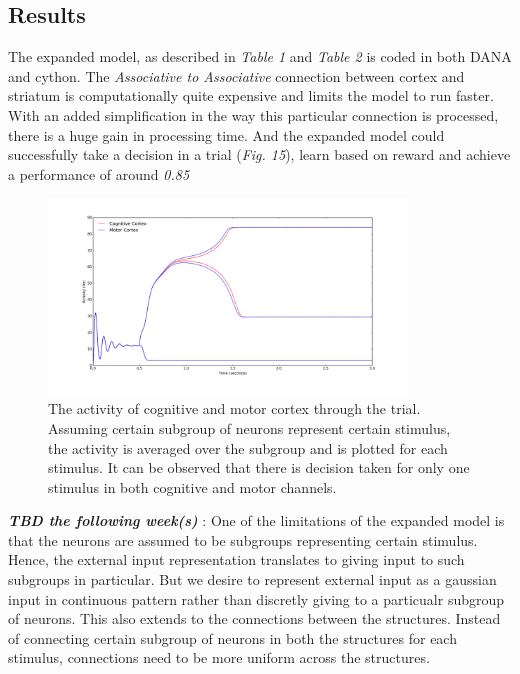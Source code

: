 \documentclass[11pt]{article}
\begin{document}
\subsection{Results}
The expanded model, as described in \emph{Table 1} and \emph{Table 2} is coded in both DANA and cython. The \emph{Associative to Associative} connection between cortex and striatum is computationally quite expensive and limits the model to run faster. With an added simplification in the way this particular connection is processed, there is a huge gain in processing time. And the expanded model could successfully take a decision in a trial (\emph{Fig. 15}), learn based on reward and achieve a performance of around \emph{0.85}
\begin{figure}[h]
\begin{center}
\includegraphics[width=0.85\textwidth]{cython_large_trial.png}
\caption[Expanded model, Activity of cortex, cognitive and motor channels.]{The activity of cognitive and motor cortex through the trial. Assuming certain subgroup of neurons represent certain stimulus, the activity is averaged over the subgroup and is plotted for each stimulus. It can be observed that there is decision taken for only one stimulus in both cognitive and motor channels.}
\end{center}
\end{figure}

\textbf{\emph{TBD the following week(s)}} : One of the limitations of the expanded model is that the neurons are assumed to be subgroups representing certain stimulus. Hence, the external input representation translates to giving input to such subgroups in particular.  But we desire to represent external input as a gaussian input in continuous pattern rather than discretly giving to a particualr subgroup of neurons. This also extends to the connections between the structures. Instead of connecting certain subgroup of neurons in both the structures for each stimulus, connections need to be more uniform across the structures.   
\clearpage
\nocite{*}
{}

\end{document}
